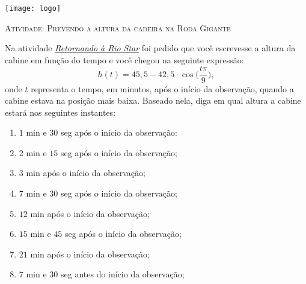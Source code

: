 \documentclass[10 pt,usenames,dvipsnames, oneside]{article}
\begin{document}
\begin{center}
  \begin{minipage}[l]{3cm}
\texttt{[image: logo]}    
\end{minipage}\hfill
\begin{minipage}[r]{.8\textwidth}
 {\Large \scshape Atividade: Prevendo a altura da cadeira na Roda Gigante}  
\end{minipage}
\end{center}
\vspace{.2cm}






Na atividade \hyperref[trig-ativ15]{\textit{Retornando à Rio Star}} foi pedido que você escrevesse a altura da cabine em função do tempo e você chegou na seguinte expressão:
\begin{equation*}
h(t)=45{,}5-42{,}5\cdot\cos\bigg(\frac{t\pi}{9}\bigg),
\end{equation*}
onde $t$ representa o tempo, em minutos, após o início da observação, quando a cabine estava na posição mais baixa. Baseado nela, diga em qual altura a cabine estará nos seguintes instantes:

\begin{enumerate}
\item $1$ min e $30$ seg após o início da observação:
\item $2$ min e $15$ seg após o início da observação;
\item $3$ min após o início da observação;
\item $7$ min e $30$ seg após o início da observação;
\item $12$ min após o início da observação;
\item $15$ min e $45$ seg após o início da observação;
\item $21$ min após o início da observação;
\item $7$ min e $30$ seg antes do início da observação;
\end{enumerate}
\end{document}
